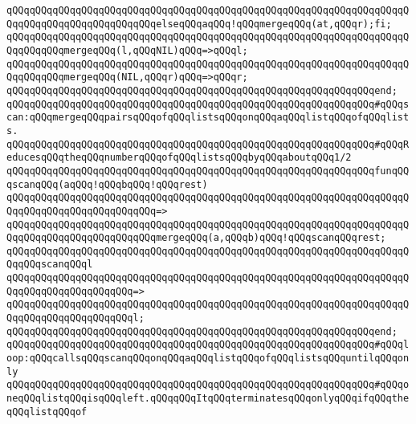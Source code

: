\verb|qQQqqQQqqQQqqQQqqQQqqQQqqQQqqQQqqQQqqQQqqQQqqQQqqQQqqQQqqQQqqQQqqQQqqQQqqQQqqQQqqQQqqQQqqQQqqQQqelseqQQqaqQQq!qQQqmergeqQQq(at,qQQqr);fi;|\newline
\newline
\verb|qQQqqQQqqQQqqQQqqQQqqQQqqQQqqQQqqQQqqQQqqQQqqQQqqQQqqQQqqQQqqQQqqQQqqQQqqQQqqQQqmergeqQQq(l,qQQqNIL)qQQq=>qQQql;|\newline
\verb|qQQqqQQqqQQqqQQqqQQqqQQqqQQqqQQqqQQqqQQqqQQqqQQqqQQqqQQqqQQqqQQqqQQqqQQqqQQqqQQqmergeqQQq(NIL,qQQqr)qQQq=>qQQqr;|\newline
\verb|qQQqqQQqqQQqqQQqqQQqqQQqqQQqqQQqqQQqqQQqqQQqqQQqqQQqqQQqqQQqqQQqend;|\newline
\newline
\verb|qQQqqQQqqQQqqQQqqQQqqQQqqQQqqQQqqQQqqQQqqQQqqQQqqQQqqQQqqQQqqQQq#qQQqscan:qQQqmergeqQQqpairsqQQqofqQQqlistsqQQqonqQQqaqQQqlistqQQqofqQQqlists.|\newline
\verb|qQQqqQQqqQQqqQQqqQQqqQQqqQQqqQQqqQQqqQQqqQQqqQQqqQQqqQQqqQQqqQQq#qQQqReducesqQQqtheqQQqnumberqQQqofqQQqlistsqQQqbyqQQqaboutqQQq1/2|\newline
\newline
\verb|qQQqqQQqqQQqqQQqqQQqqQQqqQQqqQQqqQQqqQQqqQQqqQQqqQQqqQQqqQQqqQQqfunqQQqscanqQQq(aqQQq!qQQqbqQQq!qQQqrest)|\newline
\verb|qQQqqQQqqQQqqQQqqQQqqQQqqQQqqQQqqQQqqQQqqQQqqQQqqQQqqQQqqQQqqQQqqQQqqQQqqQQqqQQqqQQqqQQqqQQqqQQq=>|\newline
\verb|qQQqqQQqqQQqqQQqqQQqqQQqqQQqqQQqqQQqqQQqqQQqqQQqqQQqqQQqqQQqqQQqqQQqqQQqqQQqqQQqqQQqqQQqqQQqqQQqmergeqQQq(a,qQQqb)qQQq!qQQqscanqQQqrest;|\newline
\newline
\verb|qQQqqQQqqQQqqQQqqQQqqQQqqQQqqQQqqQQqqQQqqQQqqQQqqQQqqQQqqQQqqQQqqQQqqQQqqQQqscanqQQql|\newline
\verb|qQQqqQQqqQQqqQQqqQQqqQQqqQQqqQQqqQQqqQQqqQQqqQQqqQQqqQQqqQQqqQQqqQQqqQQqqQQqqQQqqQQqqQQqqQQq=>|\newline
\verb|qQQqqQQqqQQqqQQqqQQqqQQqqQQqqQQqqQQqqQQqqQQqqQQqqQQqqQQqqQQqqQQqqQQqqQQqqQQqqQQqqQQqqQQqqQQql;|\newline
\verb|qQQqqQQqqQQqqQQqqQQqqQQqqQQqqQQqqQQqqQQqqQQqqQQqqQQqqQQqqQQqqQQqend;|\newline
\newline
\verb|qQQqqQQqqQQqqQQqqQQqqQQqqQQqqQQqqQQqqQQqqQQqqQQqqQQqqQQqqQQqqQQq#qQQqloop:qQQqcallsqQQqscanqQQqonqQQqaqQQqlistqQQqofqQQqlistsqQQquntilqQQqonly|\newline
\verb|qQQqqQQqqQQqqQQqqQQqqQQqqQQqqQQqqQQqqQQqqQQqqQQqqQQqqQQqqQQqqQQq#qQQqoneqQQqlistqQQqisqQQqleft.qQQqqQQqItqQQqterminatesqQQqonlyqQQqifqQQqtheqQQqlistqQQqof|\newline
